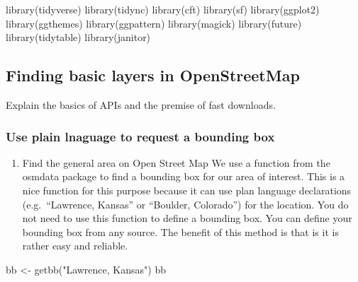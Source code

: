 \documentclass[
  paper=a4,
  ,captions=tableheading
]{scrartcl}
\newenvironment{Shaded}{\begin{snugshade}}{\end{snugshade}}
\newcommand{\FunctionTok}[1]{\textcolor[rgb]{0.00,0.00,0.00}{#1}}
\newcommand{\NormalTok}[1]{#1}
\newcommand{\OtherTok}[1]{\textcolor[rgb]{0.56,0.35,0.01}{#1}}
\newcommand{\StringTok}[1]{\textcolor[rgb]{0.31,0.60,0.02}{#1}}
\providecommand{\tightlist}{%
  \setlength{\itemsep}{0pt}\setlength{\parskip}{0pt}}
\begin{document}
\begin{Shaded}
\begin{Highlighting}[]
\FunctionTok{library}\NormalTok{(tidyverse)}
\FunctionTok{library}\NormalTok{(tidync)}
\FunctionTok{library}\NormalTok{(cft)}
\FunctionTok{library}\NormalTok{(sf)}
\FunctionTok{library}\NormalTok{(ggplot2)}
\FunctionTok{library}\NormalTok{(ggthemes)}
\FunctionTok{library}\NormalTok{(ggpattern)}
\FunctionTok{library}\NormalTok{(magick)}
\FunctionTok{library}\NormalTok{(future)}
\FunctionTok{library}\NormalTok{(tidytable)}
\FunctionTok{library}\NormalTok{(janitor)}
\end{Highlighting}
\end{Shaded}

\hypertarget{finding-basic-layers-in-openstreetmap}{%
\subsection{Finding basic layers in
OpenStreetMap}\label{finding-basic-layers-in-openstreetmap}}

Explain the basics of APIs and the premise of fast downloads.

\hypertarget{use-plain-lnaguage-to-request-a-bounding-box}{%
\subsubsection{Use plain lnaguage to request a bounding
box}\label{use-plain-lnaguage-to-request-a-bounding-box}}

\begin{enumerate}
\def\labelenumi{\arabic{enumi}.}
\tightlist
\item
  Find the general area on Open Street Map We use a function from the
  osmdata package to find a bounding box for our area of interest. This
  is a nice function for this purpose because it can use plan language
  declarations (e.g.~``Lawrence, Kansas'' or ``Boulder, Colorado'') for
  the location. You do not need to use this function to define a
  bounding box. You can define your bounding box from any source. The
  benefit of this method is that is it is rather easy and reliable.
\end{enumerate}

\begin{Shaded}
\begin{Highlighting}[]
\NormalTok{bb }\OtherTok{\textless{}{-}} \FunctionTok{getbb}\NormalTok{(}\StringTok{"Lawrence, Kansas"}\NormalTok{)}
\NormalTok{bb}
\end{Highlighting}
\end{Shaded}
\end{document}
